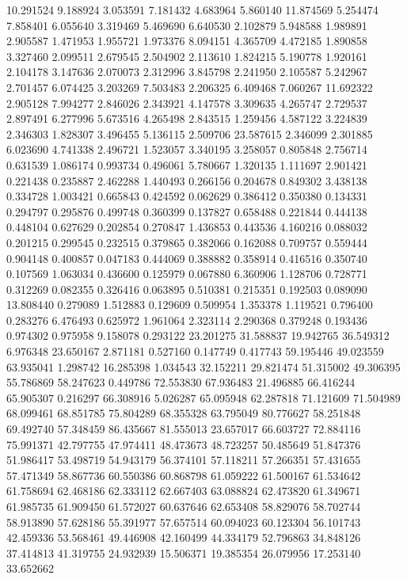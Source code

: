 10.291524
9.188924
3.053591
7.181432
4.683964
5.860140
11.874569
5.254474
7.858401
6.055640
3.319469
5.469690
6.640530
2.102879
5.948588
1.989891
2.905587
1.471953
1.955721
1.973376
8.094151
4.365709
4.472185
1.890858
3.327460
2.099511
2.679545
2.504902
2.113610
1.824215
5.190778
1.920161
2.104178
3.147636
2.070073
2.312996
3.845798
2.241950
2.105587
5.242967
2.701457
6.074425
3.203269
7.503483
2.206325
6.409468
7.060267
11.692322
2.905128
7.994277
2.846026
2.343921
4.147578
3.309635
4.265747
2.729537
2.897491
6.277996
5.673516
4.265498
2.843515
1.259456
4.587122
3.224839
2.346303
1.828307
3.496455
5.136115
2.509706
23.587615
2.346099
2.301885
6.023690
4.741338
2.496721
1.523057
3.340195
3.258057
0.805848
2.756714
0.631539
1.086174
0.993734
0.496061
5.780667
1.320135
1.111697
2.901421
0.221438
0.235887
2.462288
1.440493
0.266156
0.204678
0.849302
3.438138
0.334728
1.003421
0.665843
0.424592
0.062629
0.386412
0.350380
0.134331
0.294797
0.295876
0.499748
0.360399
0.137827
0.658488
0.221844
0.444138
0.448104
0.627629
0.202854
0.270847
1.436853
0.443536
4.160216
0.088032
0.201215
0.299545
0.232515
0.379865
0.382066
0.162088
0.709757
0.559444
0.904148
0.400857
0.047183
0.444069
0.388882
0.358914
0.416516
0.350740
0.107569
1.063034
0.436600
0.125979
0.067880
6.360906
1.128706
0.728771
0.312269
0.082355
0.326416
0.063895
0.510381
0.215351
0.192503
0.089090
13.808440
0.279089
1.512883
0.129609
0.509954
1.353378
1.119521
0.796400
0.283276
6.476493
0.625972
1.961064
2.323114
2.290368
0.379248
0.193436
0.974302
0.975958
9.158078
0.293122
23.201275
31.588837
19.942765
36.549312
6.976348
23.650167
2.871181
0.527160
0.147749
0.417743
59.195446
49.023559
63.935041
1.298742
16.285398
1.034543
32.152211
29.821474
51.315002
49.306395
55.786869
58.247623
0.449786
72.553830
67.936483
21.496885
66.416244
65.905307
0.216297
66.308916
5.026287
65.095948
62.287818
71.121609
71.504989
68.099461
68.851785
75.804289
68.355328
63.795049
80.776627
58.251848
69.492740
57.348459
86.435667
81.555013
23.657017
66.603727
72.884116
75.991371
42.797755
47.974411
48.473673
48.723257
50.485649
51.847376
51.986417
53.498719
54.943179
56.374101
57.118211
57.266351
57.431655
57.471349
58.867736
60.550386
60.868798
61.059222
61.500167
61.534642
61.758694
62.468186
62.333112
62.667403
63.088824
62.473820
61.349671
61.985735
61.909450
61.572027
60.637646
62.653408
58.829076
58.702744
58.913890
57.628186
55.391977
57.657514
60.094023
60.123304
56.101743
42.459336
53.568461
49.446908
42.160499
44.334179
52.796863
34.848126
37.414813
41.319755
24.932939
15.506371
19.385354
26.079956
17.253140
33.652662
